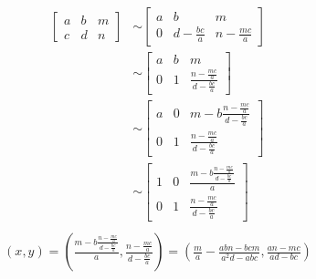 \documentclass[11pt, a4paper, norsk]{NTNUoving}
\begin{document}
\begin{oppgave}[5]
\begin{punkt}
        \begin{align*}
            \begin{bmatrix} %
            a & b & m\\
            c & d & n
            \end{bmatrix}
            &\sim
            \begin{bmatrix} %
            a & b & m\\
            0 & d-\frac{bc}{a} & n-\frac{mc}{a}
            \end{bmatrix}
            \\&\sim
            \begin{bmatrix} %
            a & b & m\\
            0 & 1 & \frac{n-\frac{mc}{a}}{d-\frac{bc}{a}}
            \end{bmatrix}
            \\&\sim
            \begin{bmatrix}
            a & 0 & m-b\frac{n-\frac{mc}{a}}{d-\frac{bc}{a}}\\
            0 & 1 & \frac{n-\frac{mc}{a}}{d-\frac{bc}{a}}
            \end{bmatrix}
            \\&\sim
            \begin{bmatrix}
            1 & 0 & \frac{m-b\frac{n-\frac{mc}{a}}{d-\frac{bc}{a}}}{a}\\
            0 & 1 & \frac{n-\frac{mc}{a}}{d-\frac{bc}{a}}
            \end{bmatrix}
        \end{align*}
        \begin{align*}
            \\(x,y) = \left(\frac{m-b\frac{n-\frac{mc}{a}}{d-\frac{bc}{a}}}{a}, \frac{n-\frac{mc}{a}}{d-\frac{bc}{a}} \right) = \left(\frac{m}{a}-\frac{abn-bcm}{a^2d-abc}, \frac{an-mc}{ad-bc} \right)
        \end{align*}
    \end{punkt}
\end{oppgave}
\end{document}
